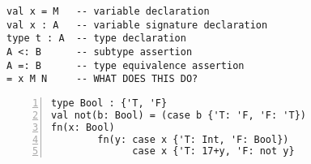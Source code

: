 \begin{lstlisting}[language=ldgv,caption=Statements in LDGV,label=lst:ldgv-statements]
val x = M   -- variable declaration
val x : A   -- variable signature declaration
type t : A  -- type declaration
A <: B      -- subtype assertion
A =: B      -- type equivalence assertion
= x M N     -- WHAT DOES THIS DO?
\end{lstlisting}

\begin{lstlisting}[language=ldgv,numbers=left,caption=Sample LDGV program,label=lst:ldgv-program]
type Bool : {'T, 'F}
val not(b: Bool) = (case b {'T: 'F, 'F: 'T})
fn(x: Bool)
        fn(y: case x {'T: Int, 'F: Bool})
              case x {'T: 17+y, 'F: not y}
\end{lstlisting}
